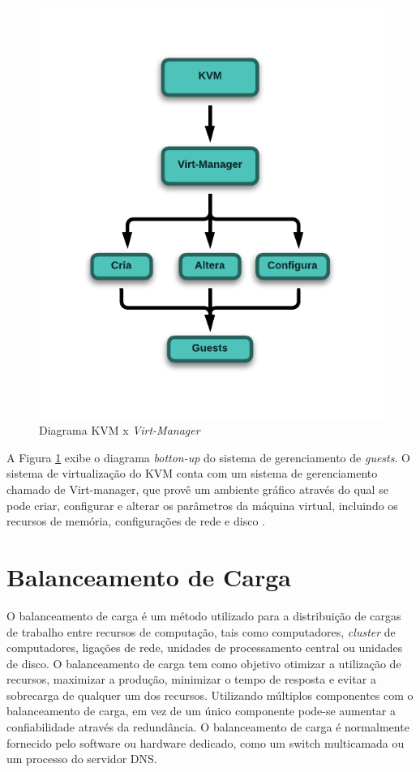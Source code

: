     
    \begin{figure}[htb]
    \centering
    \includegraphics[scale=0.80]{imagens/kvm.pdf}
    \caption{Diagrama KVM x \textit{Virt-Manager}}
    \label{fig:kvm}
    \end{figure} 
    
    A Figura \ref{fig:kvm} exibe o diagrama \textit{botton-up} do sistema de gerenciamento de \textit{guests}. O sistema de virtualização do KVM conta com um sistema de gerenciamento chamado de Virt-manager, que provê um ambiente gráfico através do qual se pode criar, configurar e alterar os parâmetros da máquina virtual, incluindo os recursos de memória, configurações de rede e disco \cite{KVM2}.


\section{Balanceamento de Carga}

    O balanceamento de carga é um método utilizado para a distribuição de cargas de trabalho entre recursos de computação, tais como computadores, \textit{cluster} de computadores, ligações de rede, unidades de processamento central ou unidades de disco. O balanceamento de carga tem como objetivo otimizar a utilização de recursos, maximizar a produção, minimizar o tempo de resposta e evitar a sobrecarga de qualquer um dos recursos. Utilizando múltiplos componentes com o balanceamento de carga, em vez de um único componente pode-se aumentar a confiabilidade através da redundância. O balanceamento de carga é normalmente fornecido pelo software ou hardware dedicado, como um switch multicamada ou um processo do servidor DNS.


